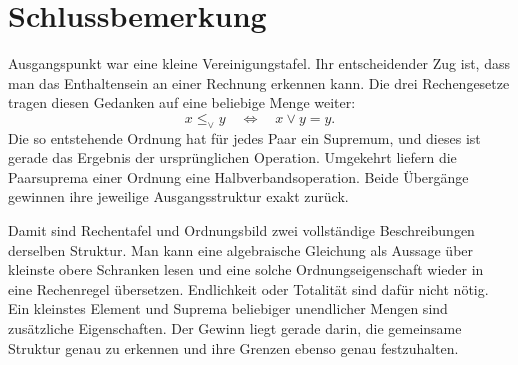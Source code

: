 \par{}
\section*{Schlussbemerkung}
\hypertarget{semilattice.reading.conclusion}{}

Ausgangspunkt war eine kleine Vereinigungstafel. Ihr entscheidender
Zug ist, dass man das Enthaltensein an einer Rechnung erkennen
kann. Die drei Rechengesetze tragen diesen Gedanken auf eine
beliebige Menge weiter:
\[
  x\leq_\vee y\quad\Longleftrightarrow\quad x\vee y=y.
\]
Die so entstehende Ordnung hat für jedes Paar ein Supremum,
und dieses ist gerade das Ergebnis der ursprünglichen Operation.
Umgekehrt liefern die Paarsuprema einer Ordnung eine
Halbverbandsoperation. Beide Übergänge gewinnen ihre jeweilige
Ausgangsstruktur exakt zurück.

Damit sind Rechentafel und Ordnungsbild zwei vollständige
Beschreibungen derselben Struktur. Man kann eine algebraische
Gleichung als Aussage über kleinste obere Schranken lesen und
eine solche Ordnungseigenschaft wieder in eine Rechenregel
übersetzen. Endlichkeit oder Totalität sind dafür nicht nötig.
Ein kleinstes Element und Suprema beliebiger unendlicher Mengen
sind zusätzliche Eigenschaften. Der Gewinn liegt gerade darin,
die gemeinsame Struktur genau zu erkennen und ihre Grenzen
ebenso genau festzuhalten.
